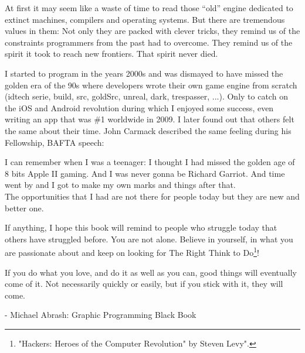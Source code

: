\documentclass[book.tex]{subfiles}
\begin{document}
\bigskip

At first it may seem like a waste of time to read those ``old'' engine dedicated to extinct machines, compilers and operating systems. But there are tremendous values in them: Not only they are packed with clever tricks, they remind us of the constraints programmers from the past had to overcome. They remind us of the spirit it took to reach new frontiers. That spirit never died.\\
\par
I started to program in the years 2000s and was dismayed to have missed the golden era of the 90s where developers wrote their own game engine from scratch (idtech serie, build, src, goldSrc, unreal, dark, trespasser, ...). Only to catch on the iOS and Android revolution during which I enjoyed some success, even writing an app that was \#1 worldwide in 2009. I later found out that others felt the same about their time. John Carmack described the same feeling during his Fellowship, BAFTA speech:\\
\par
 \begin{fancyquotes}
I can remember when I was a teenager: I thought I had missed the golden age of 8 bits Apple II gaming. And I was never gonna be Richard Garriot. And time went by and I got to make
    my own marks and things after that.\\
    
    The opportunities that I had are not there for people today but they are new and better one.
 \bigskip
 \end{fancyquotes}

\par
 If anything, I hope this book will remind to people who struggle today that others have struggled before. You are not alone. Believe in yourself, in what you are passionate about and keep on looking for The Right Think to Do\footnote{"Hackers: Heroes of the Computer Revolution" by Steven Levy".}!\\



\pagebreak
\begin{fancyquotes}
If you do what you love, and do it as well as you can, good things will eventually come of it. Not necessarily quickly or easily, but if you stick with it, they will come.
\par
- Michael Abrash: Graphic Programming Black Book\bigskip
 \end{fancyquotes}
\pagebreak  
\end{document}

